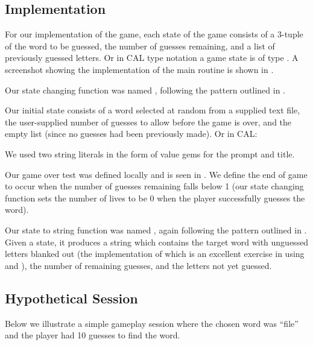 \subsection{Implementation}

For our implementation of the game, each state of the game consists of a 3-tuple of the word to be guessed, the number of guesses remaining, and a list of previously guessed letters.  Or in CAL type notation a game state is of type .  A screenshot showing the implementation of the main  routine is shown in .


Our state changing function was named , following the pattern outlined in \cite{Curtis05}.

Our initial state consists of a word selected at random from a supplied text file, the user-supplied number of guesses to allow before the game is over, and the empty list (since no guesses had been previously made).  Or in CAL: 

We used two string literals in the form of value gems for the prompt and title.

Our game over test was defined locally and is seen in .  We define the end of game to occur when the number of guesses remaining falls below 1 (our state changing function  sets the number of lives to be 0 when the player successfully guesses the word).

Our state to string function was named , again following the pattern outlined in \cite{Curtis05}.  Given a state, it produces a string which contains the target word with unguessed letters blanked out (the implementation of which is an excellent exercise in using  and ), the number of remaining guesses, and the letters not yet guessed.

\subsection{Hypothetical Session}

Below we illustrate a simple gameplay session where the chosen word was ``file'' and the player had 10 guesses to find the word.

